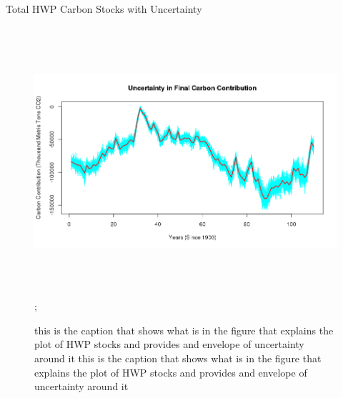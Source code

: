 \documentclass[final]{beamer}\usepackage[]{graphicx}\usepackage[]{color}
\newlength{\onecolwid}
\newlength{\twocolwid}
\begin{document}
\begin{frame}[t]
\begin{columns}[t]
\begin{column}{\twocolwid}
\begin{alertblock}{Total HWP Carbon Stocks with Uncertainty}
\begin{center}

\begin{figure}
    {\includegraphics[width=1\linewidth,height=10cm]{Uncertainty_Plot.png}};
    \caption{this is the caption that shows what is in the figure that explains the plot of HWP stocks and provides and envelope of uncertainty around it
    this is the caption that shows what is in the figure that explains the plot of HWP stocks and provides and envelope of uncertainty around it}
\end{figure}
\end{center}
\end{alertblock} 


\begin{columns}[t,totalwidth=\twocolwid] %

\begin{column}{\onecolwid} %



\end{column}
\end{columns}
\end{column}
\end{columns}
\end{frame}
\end{document}

